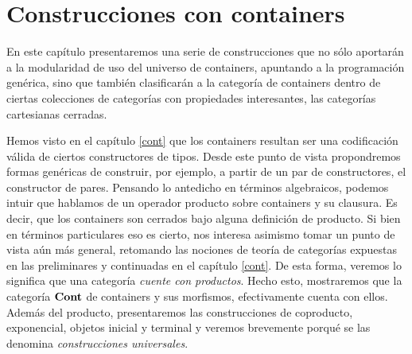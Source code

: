 \chapter{Construcciones con containers}\label{chapter:construcciones}

\begin{epigraphs}
\end{epigraphs}

En este capítulo presentaremos una serie de construcciones
que no sólo aportarán a la modularidad de uso del universo de containers, apuntando a la programación genérica, sino que también clasificarán a la categoría de containers dentro de ciertas colecciones de categorías con propiedades interesantes, las categorías cartesianas cerradas.

Hemos visto en el capítulo \ref{cont} que los containers resultan ser una codificación válida de ciertos constructores de tipos. Desde este punto de vista propondremos formas genéricas de construir, por ejemplo, a partir de un par de constructores, el constructor de pares.
Pensando lo antedicho en términos algebraicos, podemos intuir que hablamos de un operador producto sobre containers y su clausura. Es decir, que los containers son cerrados bajo alguna definición de producto. Si bien en términos particulares eso es cierto, nos interesa asimismo tomar un punto de vista aún más general, retomando las nociones de teoría de categorías expuestas en las preliminares y continuadas en el capítulo \ref{cont}. De esta forma, veremos lo significa que una categoría {\it cuente con productos}. Hecho esto, mostraremos que la categoría $\mathbf{Cont}$ de containers y sus morfismos, efectivamente cuenta con ellos.
Además del producto, presentaremos las construcciones de coproducto, exponencial, objetos inicial y terminal y veremos brevemente porqué se las denomina {\it construcciones universales}.

